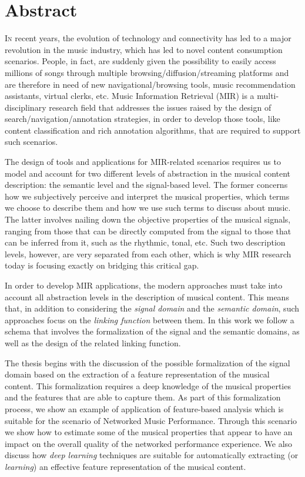 \chapter*{Abstract}
\lettrine{I}{n} recent years, the evolution of technology and connectivity has led to a major revolution in the music industry, which has led to novel content consumption scenarios. People, in fact, are suddenly given the possibility to easily access millions of songs through multiple browsing/diffusion/streaming platforms and are therefore in need of new navigational/browsing tools, music recommendation assistants, virtual clerks, etc. Music Information Retrieval (MIR) is a multi-disciplinary research field that addresses the issues raised by the design of search/navigation/annotation strategies, in order to develop those tools, like content classification and rich annotation algorithms, that are required to support such scenarios.

The design of tools and applications for MIR-related scenarios requires us to model and account for two different levels of abstraction in the musical content description: the semantic level and the signal-based level. The former concerns how we subjectively perceive and interpret the musical properties, which terms we choose to describe them and how we use such terms to discuss about music. The latter involves nailing down the objective properties of the musical signals, ranging from those that can be directly computed from the signal to those that can be inferred from it, such as the rhythmic, tonal, etc. Such two description levels, however, are very separated from each other, which is why MIR research today is focusing exactly on bridging this critical gap.

In order to develop MIR applications, the modern approaches must take into account all abstraction levels in the description of musical content. This means that, in addition to considering the \textit{signal domain} and the \textit{semantic domain}, such approaches focus on the \textit{linking function} between them. In this work we follow a schema that involves the formalization of the signal and the semantic domains, as well as the design of the related linking function.

The thesis begins with the discussion of the possible formalization of the signal domain based on the extraction of a feature representation of the musical content. This formalization requires a deep knowledge of the musical properties and the features that are able to capture them. As part of this formalization process, we show an example of application of feature-based analysis which is suitable for the scenario of Networked Music Performance. Through this scenario we show how to estimate some of the musical properties that appear to have an impact on the overall quality of the networked performance experience. We also discuss how \textit{deep learning} techniques are suitable for automatically extracting (or \textit{learning}) an effective feature representation of the musical content.


